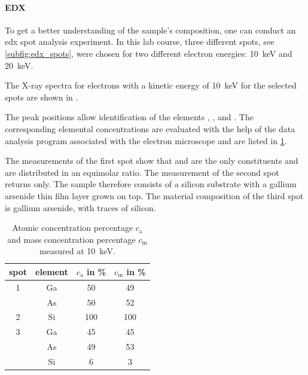 \paragraph{EDX}
To get a better understanding of the sample's composition, one can
conduct an \ac{edx} spot analysis experiment.
In this lab course, three different spots, see \cref{subfig:edx_spots},
were chosen for two different electron energies:
\qty{10}{\kilo \electronvolt}
and \qty{20}{\kilo\electronvolt}.

The X-ray spectra for electrons with a kinetic energy of
\qty{10}{\kilo\electronvolt} for the selected spots are shown
in .

The peak positions allow identification of the elements ,
, and .
The corresponding elemental concentrations are evaluated with the help
of the data analysis program associated with the electron microscope and
are listed in \cref{tab:edx_1}.

The measurements of the first spot show that  and  are
the only constituents and are distributed in an equimolar ratio.
The measurement of the second spot returns  only.
The sample therefore consists of a silicon substrate with a
gallium arsenide thin film layer grown on top.
The material composition of the third spot is gallium arsenide,
with traces of silicon.

\begin{table}
	\centering
	\begin{tabular}{cccc}
		\toprule
		spot & element & $c_\mathrm{a}$ in \unit{\percent } & $c_\mathrm{m}$ in \unit{\percent} \\
		\midrule
		1    & Ga      & 50                                 & 49                                \\
		     & As      & 50                                 & 52                                \\
		\midrule
		2    & Si      & 100                                & 100                               \\
		\midrule
		3    & Ga      & 45                                 & 45                                \\
		     & As      & 49                                 & 53                                \\
		     & Si      & 6                                  & 3                                 \\
		\bottomrule
	\end{tabular}
	\caption{Atomic concentration percentage $c_\mathrm{a}$ and mass
		concentration percentage $c_\mathrm{m}$ measured at
		\qty{10}{\kilo\electronvolt}.}
	\label{tab:edx_1}
\end{table}

